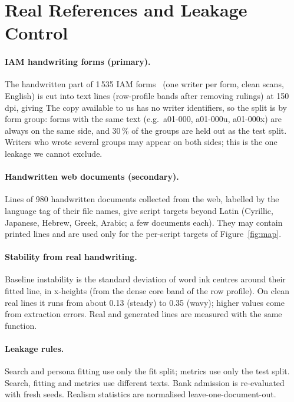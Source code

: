 \documentclass[10pt,twocolumn]{article}
\begin{document}
\section{Real References and Leakage Control}
\label{sec:refs}

\paragraph{IAM handwriting forms (primary).} The handwritten part of 1\,535 IAM forms~\cite{marti2002} (one writer
per form, clean scans, English) is cut into text lines (row-profile bands after removing rulings) at 150\,dpi,
giving  The copy available to us has no writer identifiers, so the split is by form group:
forms with the same text (e.g.\ a01-000, a01-000u, a01-000x) are always on the same side, and 30\,\% of the groups
are held out as the test split. Writers who wrote several groups may appear on both sides; this is the one
leakage we cannot exclude.

\paragraph{Handwritten web documents (secondary).} Lines of 980 handwritten documents collected from the web,
labelled by the language tag of their file names, give script targets beyond Latin (Cyrillic, Japanese, Hebrew,
Greek, Arabic; a few documents each). They may contain printed lines and are used only for the per-script targets
of Figure~\ref{fig:map}.

\paragraph{Stability from real handwriting.} Baseline instability is the standard deviation of word ink centres
around their fitted line, in x-heights (from the dense core band of the row profile). On clean real lines it
runs from about 0.13 (steady) to 0.35 (wavy); higher values come from extraction errors. Real and generated lines
are measured with the same function.

\paragraph{Leakage rules.} Search and persona fitting use only the fit split; metrics use only the test split.
Search, fitting and metrics use different texts. Bank admission is re-evaluated with fresh seeds. Realism
statistics are normalised leave-one-document-out.
\end{document}
